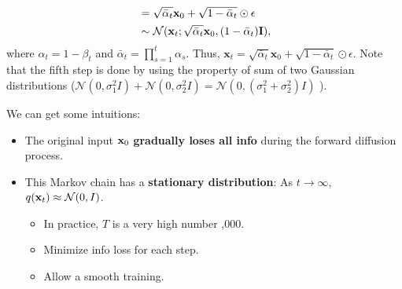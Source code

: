 \begin{itemize}
\begin{align}
						   &= \sqrt{\bar{\alpha}_t} \mathbf{x}_{0}+ \sqrt{1-\bar{\alpha}_t} \odot \epsilon\\
	&\sim \mathcal{N}(\mathbf{x}_t; \sqrt{\bar{\alpha}_t} {\mathbf{x}}_{0}, (1-\bar{\alpha}_t)\mathbf{I}),
	\label{eq:diffusion_forward_sampling}
\end{align}
			where $\alpha_t = 1-\beta_t$ and $\bar{\alpha}_t = \prod_{s=1}^t \alpha_s$. Thus, $\mathbf{x}_t= \sqrt{\bar{\alpha}_t} \mathbf{x}_{0}+ \sqrt{1-\bar{\alpha}_t} \odot \epsilon$. Note that the fifth step is done by using the property of sum of two Gaussian distributions (\eg $\mathcal{N}(0, \sigma_1^2I)+\mathcal{N}(0, \sigma_2^2I) = \mathcal{N}(0, (\sigma_1^2+\sigma_2^2)I)$ ). 
\end{itemize}

We can get some intuitions:
\begin{itemize}
	\item The original input ${\mathbf{x}}_0$ \textbf{gradually loses all info} during the forward diffusion process.
	\item This Markov chain has a \textbf{stationary distribution}: As $t\to \infty$, $q({\mathbf{x}}_t) \approx \mathcal{N}(0,I)$.
		\begin{itemize}
			\item In practice, $T$ is a very high number ,000.
			\item Minimize info loss for each step.
			\item Allow a smooth training.
		\end{itemize}
\end{itemize}


